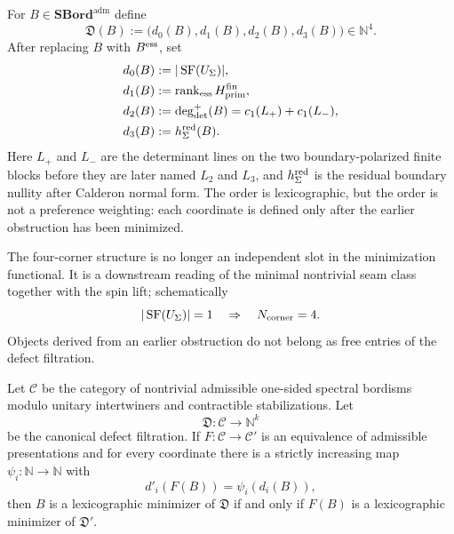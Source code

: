 \begin{definition}
\label{def:canonical-defect-filtration}
For $B\in\mathbf{SBord}^{\mathrm{adm}}$ define
\begin{equation}
\mathfrak D(B):=\bigl(d_0(B),d_1(B),d_2(B),d_3(B)\bigr)\in\mathbb N^4.
\end{equation}
After replacing $B$ with $B^{\textup{ess}}$, set
\begin{align}
d_0(B)&:=|\operatorname{SF}(U_\Sigma)|,\\
d_1(B)&:=\operatorname{rank}_{\textup{ess}} H_{\mathrm{prim}}^{\mathrm{fin}},\\
d_2(B)&:=\deg_{\det}^{+}(B)=c_1(L_+)+c_1(L_-),\\
d_3(B)&:=h_\Sigma^{\textup{red}}(B).
\end{align}
Here $L_+$ and $L_-$ are the determinant lines on the two boundary-polarized finite blocks before
they are later named $L_2$ and $L_3$, and $h_\Sigma^{\textup{red}}$ is the residual boundary nullity after
Calderon normal form. The order is lexicographic, but the order is not a preference weighting: each
coordinate is defined only after the earlier obstruction has been minimized.
\end{definition}

\begin{remark}
The four-corner structure is no longer an independent slot in the minimization functional. It is a
downstream reading of the minimal nontrivial seam class together with the spin lift; schematically
\begin{equation}
|\operatorname{SF}(U_\Sigma)|=1\quad\Rightarrow\quad N_{\rm corner}=4.
\end{equation}
Objects derived from an earlier obstruction do not belong as free entries of the defect filtration.
\end{remark}

\begin{theorem}
Let $\mathcal C$ be the category of nontrivial admissible one-sided spectral bordisms modulo unitary
intertwiners and contractible stabilizations. Let
\begin{equation}
\mathfrak D:\mathcal C\to\mathbb N^k
\end{equation}
be the canonical defect filtration. If $F:\mathcal C\to\mathcal C'$ is an equivalence of admissible
presentations and for every coordinate there is a strictly increasing map
$\psi_i:\mathbb N\to\mathbb N$ with
\begin{equation}
d'_i(F(B))=\psi_i(d_i(B)),
\end{equation}
then $B$ is a lexicographic minimizer of $\mathfrak D$ if and only if $F(B)$ is a lexicographic
minimizer of $\mathfrak D'$.
\end{theorem}


